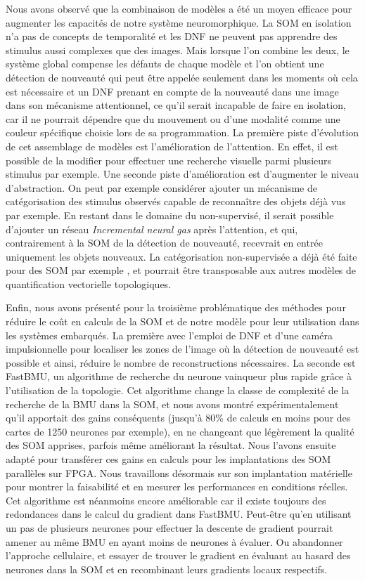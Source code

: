 Nous avons observé que la combinaison de modèles a été un moyen efficace pour augmenter les capacités de notre système neuromorphique. La SOM en isolation n'a pas de concepts de temporalité et les DNF ne peuvent pas apprendre des stimulus aussi complexes que des images. Mais lorsque l'on combine les deux, le système global compense les défauts de chaque modèle et l'on obtient une détection de nouveauté qui peut être appelée seulement dans les moments où cela est nécessaire et un DNF prenant en compte de la nouveauté dans une image dans son mécanisme attentionnel, ce qu'il serait incapable de faire en isolation, car il ne pourrait dépendre que du mouvement ou d'une modalité comme une couleur spécifique choisie lors de sa programmation. La première piste d'évolution de cet assemblage de modèles est l'amélioration de l'attention. En effet, il est possible de la modifier pour effectuer une recherche visuelle parmi plusieurs stimulus \cite{fix2011dynamic} par exemple. Une seconde piste d'amélioration est d'augmenter le niveau d'abstraction. On peut par exemple considérer ajouter un mécanisme de catégorisation des stimulus observés capable de reconnaître des objets déjà vus par exemple. En restant dans le domaine du non-supervisé, il serait possible d'ajouter un réseau \textit{Incremental neural gas} après l'attention, et qui, contrairement à la SOM de la détection de nouveauté, recevrait en entrée uniquement les objets nouveaux. La catégorisation non-supervisée a déjà été faite pour des SOM par exemple \cite{khacef2019self}, et pourrait être transposable aux autres modèles de quantification vectorielle topologiques.

Enfin, nous avons présenté pour la troisième problématique des méthodes pour réduire le coût en calculs de la SOM et de notre modèle pour leur utilisation dans les systèmes embarqués. La première avec l'emploi de DNF et d'une caméra impulsionnelle pour localiser les zones de l'image où la détection de nouveauté est possible et ainsi, réduire le nombre de reconstructions nécessaires. La seconde est FastBMU, un algorithme de recherche du neurone vainqueur plus rapide grâce à l'utilisation de la topologie. Cet algorithme change la classe de complexité de la recherche de la BMU dans la SOM, et nous avons montré expérimentalement qu'il apportait des gains conséquents (jusqu'à 80\% de calculs en moins pour des cartes de 1250 neurones par exemple), en ne changeant que légèrement la qualité des SOM apprises, parfois même améliorant la résultat. Nous l'avons ensuite adapté pour transférer ces gains en calculs pour les implantations des SOM parallèles sur FPGA. Nous travaillons désormais sur son implantation matérielle pour montrer la faisabilité et en mesurer les performances en conditions réelles. Cet algorithme est néanmoins encore améliorable car il existe toujours des redondances dans le calcul du gradient dans FastBMU. Peut-être qu'en utilisant un pas de plusieurs neurones pour effectuer la descente de gradient pourrait amener au même BMU en ayant moins de neurones à évaluer. Ou abandonner l'approche cellulaire, et essayer de trouver le gradient en évaluant au hasard des neurones dans la SOM et en recombinant leurs gradients locaux respectifs.


